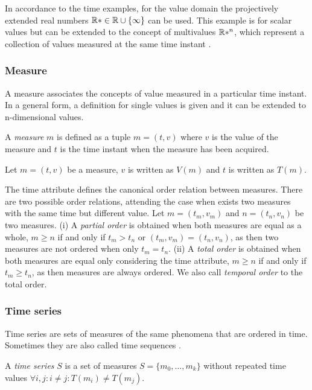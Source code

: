 In accordance to the time examples, for the value domain the
projectively extended real numbers $\mathbb{R}* \in \mathbb{R} \cup \{\infty\}$ can be
used.  This example is for scalar values but can be extended to the
concept of multivalues $\mathbb{R}*^n$, which represent a collection of values
measured at the same time instant \cite{assfalg08:thesis}.




\subsubsection{Measure}

A measure associates the concepts of value measured in a particular
time instant.  In a general form, a definition for single values is
given and it can be extended to n-dimensional values.

\begin{definition}
  A \emph{measure} $m$ is defined as a tuple $m=(t,v)$ where $v$ is the
  value of the measure and $t$ is the time instant when the measure
  has been acquired.
\end{definition}

Let $m = (t,v)$ be a measure, $v$ is written as $V(m)$ and $t$ is
written as $T(m)$.


The time attribute defines the canonical order relation between
measures. There are two possible order relations, attending the case
when exists two measures with the same time but different value. Let
$m = (t_m, v_m)$ and $n = (t_n, v_n)$ be two measures.  (i) A
\emph{partial order} is obtained when both measures are equal as a
whole, $m \geq n$ if and only if $t_m > t_n$ or $(t_m, v_m) = (t_n,
v_n)$, as then two measures are not ordered when only $t_m =
t_n$. (ii) A \emph{total order} is obtained when both measures are
equal only considering the time attribute, $m\geq n$ if and only if
$t_m\geq t_n$, as then measures are always ordered.  We also call
\emph{temporal order} to the total order.



\subsubsection{Time series}

Time series are sets of measures of the same phenomena that are
ordered in time.  Sometimes they are also called time sequences
\cite{last:hetland}.


\begin{definition}
  \label{def:model:timeseries}
  A \emph{time series} $S$ is a set of measures $S = \{m_0, \ldots,
  m_k\}$ without repeated time values $\forall i,j:i\neq j: T(m_i)\neq
  T(m_j)$.
\end{definition}

